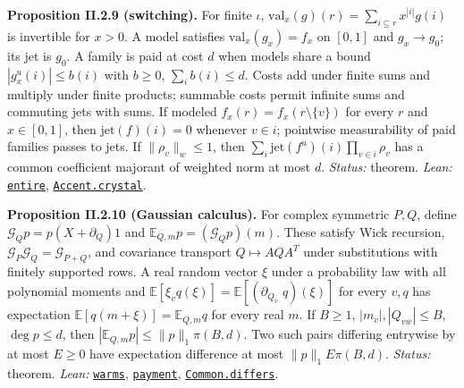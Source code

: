 \documentclass[
  letterpaper,
  11pt]{article}
\begin{document}
\textbf{Proposition II.2.9 (switching).} For finite \(\iota\),
\(\mathrm{val}_x(g)(r)=\sum_{i\subseteq r}x^{|i|}g(i)\) is invertible
for \(x>0\). A model satisfies \(\mathrm{val}_x(g_x)=f_x\) on \([0,1]\)
and \(g_x\to g_0\); its jet is \(g_0\). A family is paid at cost \(d\)
when models share a bound \(|g_x^u(i)|\le b(i)\) with \(b\ge0\),
\(\sum_i b(i)\le d\). Costs add under finite sums and multiply under
finite products; summable costs permit infinite sums and commuting jets
with sums. If modeled \(f_x(r)=f_x(r\setminus\{v\})\) for every \(r\)
and \(x\in[0,1]\), then \(\mathrm{jet}(f)(i)=0\) whenever \(v\in i\);
pointwise measurability of paid families passes to jets. If
\(\|\rho_v\|_w\le1\), then
\(\sum_i\mathrm{jet}(f^u)(i)\prod_{v\in i}\rho_v\) has a common
coefficient majorant of weighted norm at most \(d\). \emph{Status:}
theorem. \emph{Lean:}
\href{https://github.com/yang-mills-group/OpenAI-YM-20261028/blob/3456e5e75cf8d4cd558955a5c7638fba2d68f464/YM/MergeProof/Switch.lean\#L33-L42}{\texttt{entire}},
\href{https://github.com/yang-mills-group/OpenAI-YM-20261028/blob/3456e5e75cf8d4cd558955a5c7638fba2d68f464/YM/MergeProof/Jetty.lean\#L13-L19}{\texttt{Accent.crystal}}.

\textbf{Proposition II.2.10 (Gaussian calculus).} For complex symmetric
\(P,Q\), define \(\mathcal G_Qp=p(X+\partial_Q)1\) and
\(\mathbb E_{Q,m}p=(\mathcal G_Qp)(m)\). These satisfy Wick recursion,
\(\mathcal G_P\mathcal G_Q=\mathcal G_{P+Q}\), and covariance transport
\(Q\mapsto AQA^T\) under substitutions with finitely supported rows. A
real random vector \(\xi\) under a probability law with all polynomial
moments and
\(\mathbb E[\xi_vq(\xi)]=\mathbb E[(\partial_{Q_{v\cdot}}q)(\xi)]\) for
every \(v,q\) has expectation \(\mathbb E[q(m+\xi)]=\mathbb E_{Q,m}q\)
for every real \(m\). If \(B\ge1\), \(|m_v|,|Q_{vw}|\le B\),
\(\deg p\le d\), then \(|\mathbb E_{Q,m}p|\le\|p\|_1\pi(B,d)\). Two such
pairs differing entrywise by at most \(E\ge0\) have expectation
difference at most \(\|p\|_1E\pi(B,d)\). \emph{Status:} theorem.
\emph{Lean:}
\href{https://github.com/yang-mills-group/OpenAI-YM-20261028/blob/3456e5e75cf8d4cd558955a5c7638fba2d68f464/YM/Next/RANK/Gaussian.lean\#L96-L102}{\texttt{warms}},
\href{https://github.com/yang-mills-group/OpenAI-YM-20261028/blob/3456e5e75cf8d4cd558955a5c7638fba2d68f464/YM/Next/RANK/ParticleMoment.lean\#L61-L78}{\texttt{payment}},
\href{https://github.com/yang-mills-group/OpenAI-YM-20261028/blob/3456e5e75cf8d4cd558955a5c7638fba2d68f464/YM/Next/RANK/Common.lean\#L124-L126}{\texttt{Common.differs}}.
\end{document}
